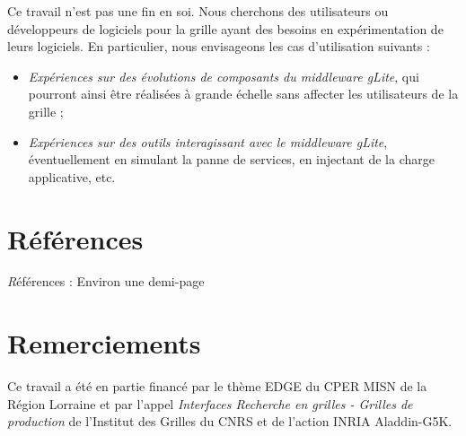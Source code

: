 \documentclass[a4paper,11pt]{article}
\newcommand{\todo}[1]{{\color{red}\textsl #1}}
\begin{document}
Ce travail n'est pas une fin en soi. Nous cherchons des utilisateurs ou
développeurs de logiciels pour la grille ayant des besoins en expérimentation
de leurs logiciels. En particulier, nous envisageons les cas d'utilisation
suivants :

\begin{itemize}

\item \textit{Expériences sur des évolutions de composants du middleware
	gLite}, qui pourront ainsi être réalisées à grande échelle sans
	affecter les utilisateurs de la grille ;

\item \textit{Expériences sur des outils interagissant avec le middleware
	gLite}, éventuellement en simulant la panne de services, en injectant
	de la charge applicative, etc.

\end{itemize}

\section{Références}
\todo{Références : Environ une demi-page}



\section*{Remerciements}

Ce travail a été en partie financé par le thème EDGE du CPER MISN de la Région
Lorraine et par l'appel \textsl{Interfaces Recherche en grilles - Grilles de
production} de l'Institut des Grilles du CNRS et de l'action INRIA Aladdin-G5K.
\end{document}
